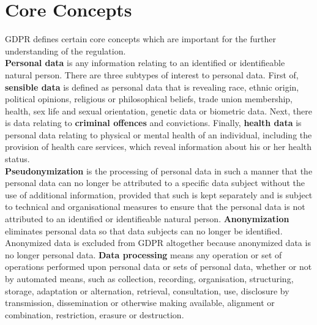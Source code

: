 \documentclass[a4paper,12pt]{report}
\begin{document}
	\section{Core Concepts}
	\startsection
	GDPR defines certain core concepts which are important for the further understanding of the regulation.\\
	\textbf{Personal data} is any information relating to an identified or identifieable natural person.
	There are three subtypes of interest to personal data. 
	First of, \textbf{sensible data} is defined as personal data that is revealing race, ethnic origin, political opinions, religious or philosophical beliefs, trade union membership, health, sex life and sexual orientation, genetic data or biometric data.
	Next, there is data relating to \textbf{criminal offences} and convictions.
	Finally, \textbf{health data} is personal data relating to physical or mental health of an individual, including the provision of health care services, which reveal information about his or her health status.\\
	\textbf{Pseudonymization} is the processing of personal data in such a manner that the personal data can no longer be attributed to a specific data subject without the use of additional information, provided that such is kept separately and is subject to technical and organisational measures to ensure that the personal data is not attributed to an identified or identifieable natural person.
	\textbf{Anonymization} eliminates personal data so that data subjects can no longer be identified. 
	Anonymized data is excluded from GDPR altogether because anonymized data is no longer personal data.
	\textbf{Data processing} means any operation or set of operations performed upon personal data or sets of personal data, whether or not by automated means, such as collection, recording, organisation, structuring, storage, adaptation or alternation, retrieval, consultation, use, disclosure by transmission, dissemination or otherwise making available, alignment or combination, restriction, erasure or destruction.
	\closesection
\end{document}
